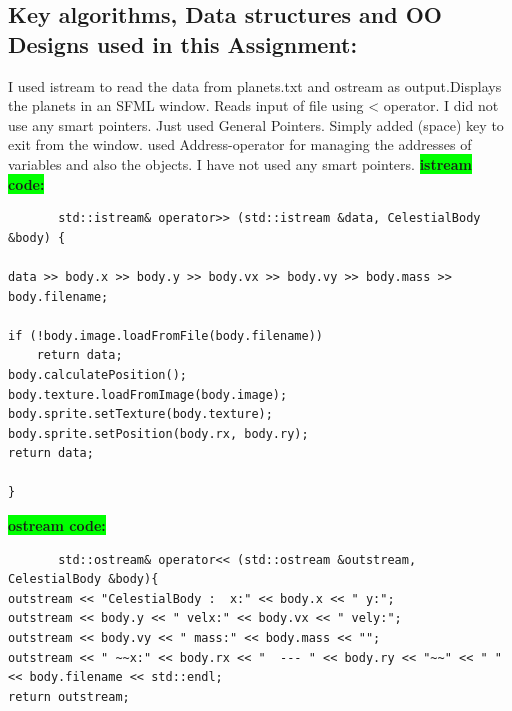\subsection{Key algorithms, Data structures and OO Designs used in this Assignment:}\label{sec:ps3a:kdo}
I used istream to read the data from planets.txt and ostream as output.Displays the planets in an SFML window.
       Reads input of file using < operator.  
       I did not use any smart pointers. Just used General Pointers.
       Simply added (space) key to exit from the window.
       used Address-operator for managing the addresses of variables and also the objects.
       I have not used any smart pointers. \newline
       \textbf{\colorbox{lime}{istream code:}}
       \begin{lstlisting}
       std::istream& operator>> (std::istream &data, CelestialBody &body) {

data >> body.x >> body.y >> body.vx >> body.vy >> body.mass >> body.filename;

if (!body.image.loadFromFile(body.filename))
    return data;
body.calculatePosition();
body.texture.loadFromImage(body.image);
body.sprite.setTexture(body.texture);
body.sprite.setPosition(body.rx, body.ry);
return data;

}
       \end{lstlisting}
              \textbf{\colorbox{lime}{ostream code:}}
       \begin{lstlisting}
       std::ostream& operator<< (std::ostream &outstream, CelestialBody &body){
outstream << "CelestialBody :  x:" << body.x << " y:";
outstream << body.y << " velx:" << body.vx << " vely:";
outstream << body.vy << " mass:" << body.mass << "";
outstream << " ~~x:" << body.rx << "  --- " << body.ry << "~~" << " " << body.filename << std::endl;
return outstream;
       \end{lstlisting}

